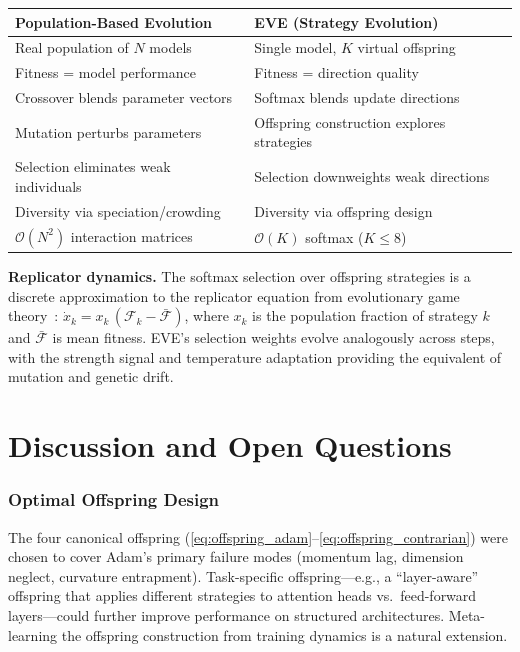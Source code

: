 \documentclass[12pt]{article}
\newcommand{\notebox}[1]{%
  \begin{tcolorbox}[notestyle]
    #1
  \end{tcolorbox}
}
\begin{document}
\medskip
\begin{center}
\small
\begin{tabular}{@{}p{5.5cm}p{5.5cm}@{}}
  \toprule
  Population-Based Evolution & EVE (Strategy Evolution) \\
  \midrule
  Real population of $N$ models &
    Single model, $K$ virtual offspring \\
  Fitness = model performance &
    Fitness = direction quality \\
  Crossover blends parameter vectors &
    Softmax blends update directions \\
  Mutation perturbs parameters &
    Offspring construction explores strategies \\
  Selection eliminates weak individuals &
    Selection downweights weak directions \\
  Diversity via speciation/crowding &
    Diversity via offspring design \\
  $\mathcal{O}(N^2)$ interaction matrices &
    $\mathcal{O}(K)$ softmax ($K \leq 8$) \\
  \bottomrule
\end{tabular}
\end{center}

\notebox{%
\textbf{Replicator dynamics.}
The softmax selection over offspring strategies is a discrete
approximation to the replicator equation from evolutionary game
theory~\cite{taylor1978evolutionary}:
$\dot{x}_k = x_k\,(\mathcal{F}_k - \bar{\mathcal{F}})$,
where $x_k$ is the population fraction of strategy $k$ and
$\bar{\mathcal{F}}$ is mean fitness.
EVE's selection weights evolve analogously across steps, with the
strength signal and temperature adaptation providing the equivalent
of mutation and genetic drift.
}


\section{Discussion and Open Questions}
\label{sec:discussion}

\subsubsection{Optimal Offspring Design}

The four canonical offspring
(\cref{eq:offspring_adam}--\cref{eq:offspring_contrarian}) were chosen
to cover Adam's primary failure modes (momentum lag, dimension neglect,
curvature entrapment).
Task-specific offspring---e.g., a ``layer-aware'' offspring that applies
different strategies to attention heads vs.\ feed-forward layers---could
further improve performance on structured architectures.
Meta-learning the offspring construction from training dynamics is a
natural extension.
\end{document}
